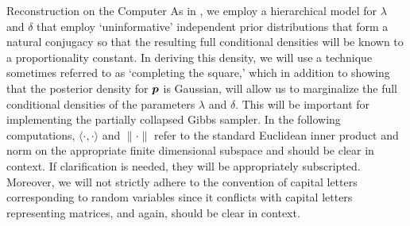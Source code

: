 \begin{chapter}{Reconstruction on the Computer}
As in \citep{bardsley2012mcmc}, we employ a hierarchical model for $\lambda$ and $\delta$ that employ `uninformative' independent prior distributions that form a natural conjugacy so that the resulting full conditional densities will be known to a proportionality constant.
In deriving this density, we will use a technique sometimes referred to as `completing the square,' which in addition to showing that the posterior density for $\mbox{\boldmath$p$}$ is Gaussian, will allow us to marginalize the full conditional densities of the parameters $\lambda$ and $\delta$.
This will be important for implementing the partially collapsed Gibbs sampler.
In the following computations, $\langle \cdot, \cdot \rangle$ and $\|\cdot\|$ refer to the standard Euclidean inner product and norm on the appropriate finite dimensional subspace and should be clear in context.
If clarification is needed, they will be appropriately subscripted. 
Moreover, we will not strictly adhere to the convention of capital letters corresponding to random variables since it conflicts with capital letters representing matrices, and again, should be clear in context.


\end{chapter}

